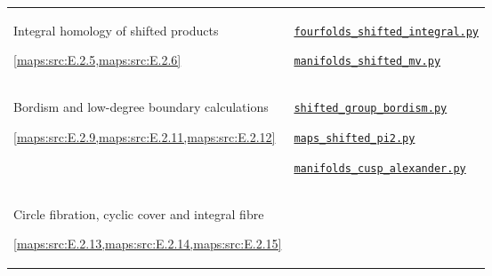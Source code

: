 \documentclass[11pt,a4paper]{article}
\numberwithin{equation}{section}
\theoremstyle{definition}
\newcommand{\SsixRepositoryCommit}{83d76022bcd442278b760db9ff438afceed6c6ea}
\begin{document}
\begin{longtable}{@{}p{}p{}@{}}
\hypertarget{prog:V:shifted-homology}{}Integral homology of shifted products\par \cref{maps:src:E.2.5,maps:src:E.2.6} &
\href{https://github.com/KokunoYumeto/s6-complex-structure-workbench/blob/\SsixRepositoryCommit/pro_returns/S6_10_PAPERS_checkpoint_15_20261119T1045Z/S6_10_PAPERS/code/V/replay_chains/code/fourfolds_shifted_integral.py}{\nolinkurl{fourfolds_shifted_integral.py}}\par \href{https://github.com/KokunoYumeto/s6-complex-structure-workbench/blob/\SsixRepositoryCommit/pro_returns/S6_10_PAPERS_checkpoint_15_20261119T1045Z/S6_10_PAPERS/code/V/replay_chains/code/manifolds_shifted_mv.py}{\nolinkurl{manifolds_shifted_mv.py}} \\[3pt]
\hypertarget{prog:V:equivariant}{}Bordism and low-degree boundary calculations\par \cref{maps:src:E.2.9,maps:src:E.2.11,maps:src:E.2.12} &
\href{https://github.com/KokunoYumeto/s6-complex-structure-workbench/blob/\SsixRepositoryCommit/pro_returns/S6_10_PAPERS_checkpoint_15_20261119T1045Z/S6_10_PAPERS/code/V/replay_chains/code/shifted_group_bordism.py}{\nolinkurl{shifted_group_bordism.py}}\par \href{https://github.com/KokunoYumeto/s6-complex-structure-workbench/blob/\SsixRepositoryCommit/pro_returns/S6_10_PAPERS_checkpoint_15_20261119T1045Z/S6_10_PAPERS/code/V/replay_chains/code/maps_shifted_pi2.py}{\nolinkurl{maps_shifted_pi2.py}}\par \href{https://github.com/KokunoYumeto/s6-complex-structure-workbench/blob/\SsixRepositoryCommit/pro_returns/S6_10_PAPERS_checkpoint_15_20261119T1045Z/S6_10_PAPERS/code/V/replay_chains/code/manifolds_cusp_alexander.py}{\nolinkurl{manifolds_cusp_alexander.py}} \\[3pt]
\hypertarget{prog:V:cyclic-cover}{}Circle fibration, cyclic cover and integral fibre\par \cref{maps:src:E.2.13,maps:src:E.2.14,maps:src:E.2.15} &

\end{longtable}
\end{document}
